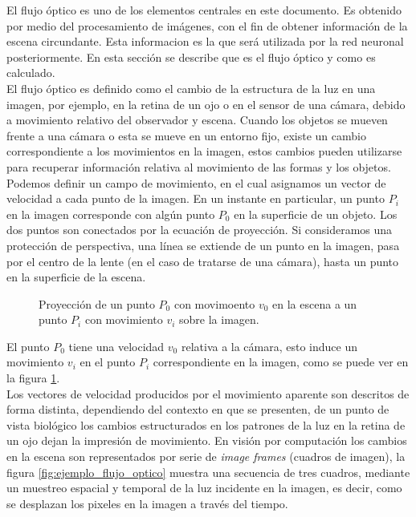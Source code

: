 \documentclass{iccmemoria}
\begin{document}
El flujo óptico es uno de los elementos centrales en este documento. Es obtenido por medio del procesamiento de imágenes, con el fin de obtener información de la escena circundante. Esta informacion es la que será utilizada por la red neuronal posteriormente. En esta sección se describe que es el flujo óptico y como es calculado.\\

El flujo óptico es definido como el cambio de la estructura de la luz en una imagen, por ejemplo, en la retina de un ojo o en el sensor de una cámara, debido a movimiento relativo del observador y escena. Cuando los objetos se mueven frente a una cámara o esta se mueve en un entorno fijo, existe un cambio correspondiente a los movimientos en la imagen, estos cambios pueden utilizarse para recuperar información relativa al movimiento de las formas y los objetos.\\

Podemos definir un campo de movimiento, en el cual asignamos un vector de velocidad a cada punto de la imagen. En un instante en particular, un punto $P_i$ en la imagen corresponde con algún punto $P_0$ en la superficie de un objeto. Los dos puntos son conectados por la ecuación de proyección. Si consideramos una protección de perspectiva, una línea se extiende de un punto en la imagen, pasa por el centro de la lente (en el caso de tratarse de una cámara), hasta un punto en la superficie de la escena.\\


\begin{figure}[H]
  \centering
  
  \caption[Proyección de un punto sobre la imagen.]{Proyección de un punto $P_0$ con movimoento $v_0$ en la escena  a un punto $P_i$ con movimiento $v_i$ sobre la imagen.}
  \label{fig:proyeccion_flujo_optico}
\end{figure}

El punto $P_{0}$ tiene una velocidad $v_{0}$ relativa a la cámara, esto induce un movimiento $v_{i}$ en el punto $P_{i}$ correspondiente en la imagen, como se puede ver en la figura \ref{fig:proyeccion_flujo_optico}\cite{horn1986robot}.\\

Los vectores de velocidad producidos por el movimiento aparente son descritos de forma distinta, dependiendo del contexto en que se presenten, de un punto de vista biológico los cambios estructurados en los patrones de la luz en la retina de un ojo dejan la impresión de movimiento. En visión por computación los cambios en la escena son representados por serie de \emph{image frames} (cuadros de imagen), la figura \ref{fig:ejemplo_flujo_optico} muestra una secuencia de tres cuadros, mediante un muestreo espacial y temporal de la luz incidente en la imagen, es decir, como se desplazan los pixeles en la imagen a través del tiempo.\\
\end{document}
